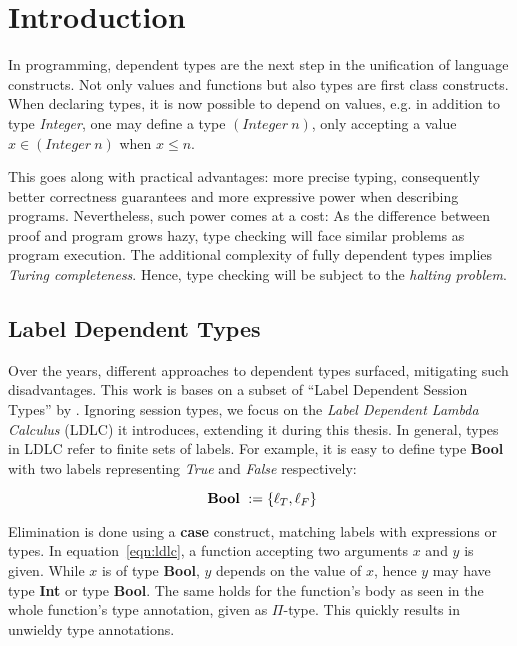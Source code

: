 \chapter{Introduction}\label{chap:introduction}

In programming, dependent types are the next step in the unification of language constructs. Not only values and functions but also types are first class constructs. When declaring types, it is now possible to depend on values, e.g. in addition to type \emph{Integer}, one may define a type $(Integer~n)$, only accepting a value $x \in (Integer~n)$ when $x \leq n$.

This goes along with practical advantages: more precise typing, consequently better correctness guarantees and more expressive power when describing programs. Nevertheless, such power comes at a cost: As the difference between proof and program grows hazy, type checking will face similar problems as program execution. The additional complexity of fully dependent types implies \emph{Turing completeness}. Hence, type checking will be subject to the \emph{halting problem}.

\section{Label Dependent Types}

Over the years, different approaches to dependent types surfaced, mitigating such disadvantages. This work is bases on a subset of ``Label Dependent Session Types'' by \cite{thiemann2019}. Ignoring session types, we focus on the \emph{Label Dependent Lambda Calculus} (LDLC) it introduces, extending it during this thesis. In general, types in LDLC refer to finite sets of labels. For example, it is easy to define type \textbf{Bool} with two labels representing \emph{True} and \emph{False} respectively:

\begin{equation}\label{eqn:bool}
\text{ \textbf{Bool} }    := \{\ell_{T}, \ell_{F}\}
\end{equation}

Elimination is done using a \textbf{case} construct, matching labels with expressions or types. In equation~\ref{eqn:ldlc}, a function accepting two arguments $x$ and $y$ is given. While $x$ is of type \textbf{Bool}, $y$ depends on the value of $x$, hence $y$ may have type \textbf{Int} or type \textbf{Bool}. The same holds for the function's body as seen in the whole function's type annotation, given as $\Pi$-type. This quickly results in unwieldy type annotations.

